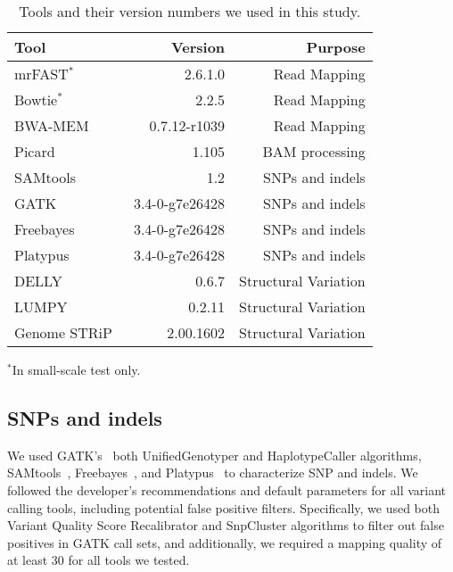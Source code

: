 \documentclass[10pt,a4paper]{article}
\begin{document}
\begin{table}[htb]
\caption{Tools and their version numbers we used in this study.}
\begin{center}
\begin{tabular}{|l|r|r|}
\hline
{\bf Tool} & {\bf Version} & {\bf Purpose}\\
\hline
mrFAST$^*$~\cite{Alkan2009,Xin2013} & 2.6.1.0 & Read Mapping \\
Bowtie$^*$~\cite{Langmead2009} & 2.2.5 & Read Mapping \\
BWA-MEM~\cite{Li2013} & 0.7.12-r1039 & Read Mapping\\
Picard~\cite{picard} & 1.105 & BAM processing\\
SAMtools~~\cite{Li2009b} & 1.2 & SNPs and indels\\
GATK~\cite{DePristo2011} & 3.4-0-g7e26428 & SNPs and indels\\
Freebayes~\cite{Garrison2012} & 3.4-0-g7e26428 & SNPs and indels\\
Platypus~\cite{Rimmer2014} & 3.4-0-g7e26428 & SNPs and indels\\
DELLY~\cite{Rausch2012} & 0.6.7 & Structural Variation\\
LUMPY~\cite{Layer2014} & 0.2.11 & Structural Variation\\
Genome STRiP~\cite{Handsaker2011,Handsaker2015} & 2.00.1602 & Structural Variation\\
\hline
\end{tabular}
\end{center}
    {\footnotesize $^*$In small-scale test only.}

\label{tab:tools}
\end{table}

\subsection{SNPs and indels}

We used GATK's~\cite{DePristo2011} both UnifiedGenotyper and HaplotypeCaller algorithms, SAMtools~\cite{Li2009b}, Freebayes~\cite{Garrison2012}, and Platypus~\cite{Rimmer2014} to characterize
SNP and indels. We followed the developer's recommendations and default parameters for all variant calling tools, including potential false positive filters. 
Specifically, we used both Variant Quality Score Recalibrator and SnpCluster algorithms to filter out false positives in GATK call sets, and additionally, 
we required a mapping quality of at least 30 for all tools we tested.
\end{document}
